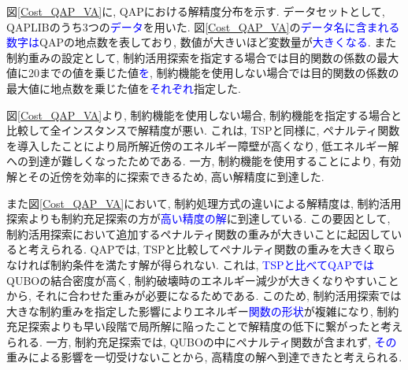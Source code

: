\documentclass[submit,techrep,noauthor]{ipsj}
\begin{document}
図\ref{Cost_QAP_VA}に, QAPにおける解精度分布を示す. データセットとして, QAPLIB\cite{qaplib}のうち3つの\textcolor{blue}{データ}を用いた. 図\ref{Cost_QAP_VA}の\textcolor{blue}{データ名に含まれる数字は}QAPの地点数を表しており, 数値が大きいほど変数量が\textcolor{blue}{大きくなる}. また制約重みの設定として, 制約活用探索を指定する場合では目的関数の係数の最大値に20までの値を乗じた値\textcolor{blue}{を}, 制約機能を使用しない場合では目的関数の係数の最大値に地点数を乗じた値を\textcolor{blue}{それぞれ}指定した.

図\ref{Cost_QAP_VA}より, 制約機能を使用しない場合, 制約機能を指定する場合と比較して全インスタンスで解精度が悪い. これは, TSPと同様に, ペナルティ関数を導入したことにより局所解近傍のエネルギー障壁が高くなり, 低エネルギー解への到達が難しくなったためである. 一方, 制約機能を使用することにより, 有効解とその近傍を効率的に探索できるため, 高い解精度に到達した.

また図\ref{Cost_QAP_VA}において, 制約処理方式の違いによる解精度は, 制約活用探索よりも制約充足探索の方が\textcolor{blue}{高い精度の解}に到達している. この要因として, 制約活用探索において追加するペナルティ関数の重みが大きいことに起因していると考えられる. QAPでは, TSPと比較してペナルティ関数の重みを大きく取らなければ制約条件を満たす解が得られない. これは, \textcolor{blue}{TSPと比べてQAPでは}QUBOの結合密度が高く, 制約破壊時のエネルギー減少が大きくなりやすいことから, それに合わせた重みが必要になるためである. このため, 制約活用探索では大きな制約重みを指定した影響によりエネルギー\textcolor{blue}{関数の形状}が複雑になり, 制約充足探索よりも早い段階で局所解に陥ったことで解精度の低下に繋がったと考えられる. 一方, 制約充足探索では, QUBOの中にペナルティ関数が含まれず, \textcolor{blue}{その}重みによる影響を一切受けないことから, 高精度の解へ到達できたと考えられる.

\end{document}
